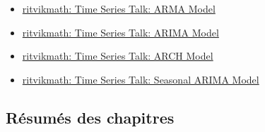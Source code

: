 \documentclass[12pt, titlepage, french]{report}
\begin{document}
\begin{YTB_vids}
\begin{itemize}
	\item	\href{https://www.youtube.com/watch?v=HhvTlaN06AM&list=PLvcbYUQ5t0UHOLnBzl46_Q6QKtFgfMGc3&index=9}{ritvikmath: Time Series Talk: ARMA Model}
	\item	\href{https://www.youtube.com/watch?v=3UmyHed0iYE&list=PLvcbYUQ5t0UHOLnBzl46_Q6QKtFgfMGc3&index=9}{ritvikmath: Time Series Talk: ARIMA Model}
	\item	\href{https://www.youtube.com/watch?v=Li95a2biFCU&list=PLvcbYUQ5t0UHOLnBzl46_Q6QKtFgfMGc3&index=8}{ritvikmath: Time Series Talk: ARCH Model}
	\item	\href{https://www.youtube.com/watch?v=WjeGUs6mzXg&list=PLvcbYUQ5t0UHOLnBzl46_Q6QKtFgfMGc3&index=2}{ritvikmath: Time Series Talk: Seasonal ARIMA Model}
\end{itemize}
\end{YTB_vids}

\subsection{Résumés des chapitres}
\end{document}
